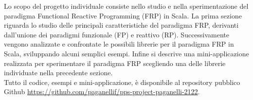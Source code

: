 \documentclass[../main.tex]{subfiles}
\begin{document}
Lo scopo del progetto individuale consiste nello studio e nella sperimentazione del paradigma Functional Reactive Programming (FRP) in Scala. La prima sezione riguarda lo studio delle principali caratteristiche del paradigma FRP, derivanti dall'unione dei paradigmi funzionale (FP) e reattivo (RP). Successivamente vengono analizzate e confrontate le possibili librerie per il paradigma FRP in Scala, sviluppando alcuni semplici esempi. Infine si descrive una mini-applicazione realizzata per sperimentare il paradigma FRP scegliendo una delle librerie individuate nella precedente sezione. \\ 
Tutto il codice, esempi e mini-applicazione, è disponibile al repository pubblico Github \url{https://github.com/paganellif/pps-project-paganelli-2122}.
\end{document}
